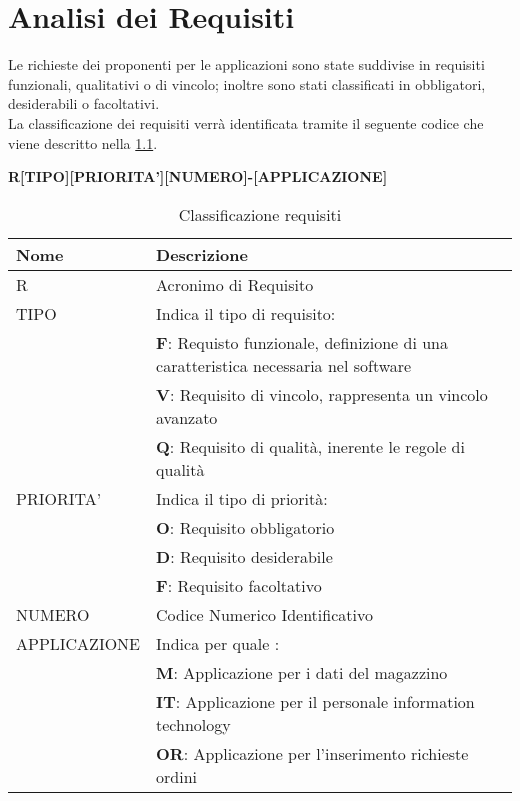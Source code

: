 \chapter{Analisi dei Requisiti}
Le richieste dei proponenti per le applicazioni sono state suddivise in requisiti funzionali, qualitativi o di vincolo; inoltre sono stati classificati in obbligatori, desiderabili o facoltativi.\\
La classificazione dei requisiti verrà identificata tramite il seguente codice che viene descritto nella \tablename \space \ref*{tab:Requisiti}.
\begin{center}
  \textbf{R[TIPO][PRIORITA'][NUMERO]-[APPLICAZIONE]}
\end{center}

\renewcommand{\arraystretch}{1.1} %
\begin{table}[H]
\begin{tabular}{ |m{8em}|m{26em}| }
  \hline
  \textbf{Nome} & \textbf{Descrizione} \\
  \hline
  R & Acronimo di Requisito \\
  \hline
  TIPO & Indica il tipo di requisito: \\
        & \textbf{F}: Requisto funzionale, definizione di una caratteristica necessaria nel software \\
        &	\textbf{V}: Requisito di vincolo, rappresenta un vincolo avanzato \\
        &	\textbf{Q}: Requisito di qualità, inerente le regole di qualità \\
  \hline
  PRIORITA' & Indica il tipo di priorità: \\
        &	\textbf{O}: Requisito obbligatorio \\
        &	\textbf{D}: Requisito desiderabile \\
        &	\textbf{F}: Requisito facoltativo \\
  \hline
  NUMERO & Codice Numerico Identificativo \\
  \hline
  APPLICAZIONE & Indica per quale : \\
               & \textbf{M}: Applicazione per i dati del magazzino \\
               & \textbf{IT}: Applicazione per il personale information technology \\
               & \textbf{OR}: Applicazione per l'inserimento richieste ordini \\
  \hline
\end{tabular}
\caption{Classificazione requisiti}
\label{tab:Requisiti}
\end{table}

